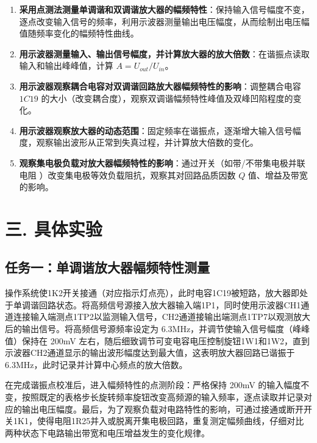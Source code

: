\documentclass[12pt]{article}
\begin{document}
\vspace{1em}
\begin{enumerate}
    \item[(1)] \textbf{采用点测法测量单调谐和双调谐放大器的幅频特性}：保持输入信号幅度不变，逐点改变输入信号的频率，利用示波器测量输出电压幅度，从而绘制出电压幅值随频率变化的幅频特性曲线。
    \item[(2)] \textbf{用示波器测量输入、输出信号幅度，并计算放大器的放大倍数}：在谐振点读取输入和输出峰峰值，计算 $A = U_{out} / U_{in}$。
    \item[(3)] \textbf{用示波器观察耦合电容对双调谐回路放大器幅频特性的影响}：调整耦合电容 $1C19$ 的大小（改变耦合度），观察双调谐幅频特性峰值及双峰凹陷程度的变化。
    \item[(4)] \textbf{用示波器观察放大器的动态范围}：固定频率在谐振点，逐渐增大输入信号幅度，观察输出波形从正常到失真过程，并计算放大倍数的变化。
    \item[(5)] \textbf{观察集电极负载对放大器幅频特性的影响}：通过开关（如带/不带集电极并联电阻 ）改变集电极等效负载阻抗，观察其对回路品质因数 $Q$ 值、增益及带宽的影响。
\end{enumerate}

\section*{三. 具体实验}

\subsection*{任务一：单调谐放大器幅频特性测量}

操作系统使1K2开关接通（对应指示灯点亮），此时电容1C19被短路，放大器即处于单调谐回路状态。将高频信号源接入放大器输入端1P1，同时使用示波器CH1通道连接输入端测点1TP2以监测输入信号，CH2通道接输出端测点1TP7以观测放大后的输出信号。将高频信号源频率设定为 6.3MHz，并调节使输入信号幅度（峰峰值）保持在 200mV 左右，随后细致调节可变电容电压控制旋钮1W1和1W2，直到示波器CH2通道显示的输出波形幅度达到最大值，这表明放大器回路已谐振于 6.3MHz，此时记录并计算中心频点的放大倍数。

在完成谐振点校准后，进入幅频特性的点测阶段：严格保持 200mV 的输入幅度不变，按照既定的表格步长旋转频率旋钮改变高频源的输入频率，逐点读取并记录对应的输出电压幅度。最后，为了观察负载对电路特性的影响，可通过接通或断开开关1K1，使得电阻1R25并入或脱离开集电极回路，重复测定幅频曲线，仔细对比两种状态下电路输出带宽和电压增益发生的变化规律。
\end{document}
